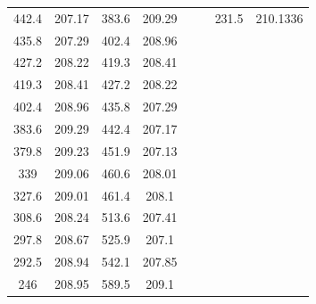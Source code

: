 \begin{center}
\begin{tabular}{|cccc|cc|cc|}
    442.4    & 207.17                  & 383.6  & 209.29                      &        &                             & 231.5    & 210.1336                           \\
    435.8    & 207.29                  & 402.4  & 208.96                      &        &                             &          &                                    \\
    427.2    & 208.22                  & 419.3  & 208.41                      &        &                             &          &                                    \\
    419.3    & 208.41                  & 427.2  & 208.22                      &        &                             &          &                                    \\
    402.4    & 208.96                  & 435.8  & 207.29                      &        &                             &          &                                    \\
    383.6    & 209.29                  & 442.4  & 207.17                      &        &                             &          &                                    \\
    379.8    & 209.23                  & 451.9  & 207.13                      &        &                             &          &                                    \\
    339      & 209.06                  & 460.6  & 208.01                      &        &                             &          &                                    \\
    327.6    & 209.01                  & 461.4  & 208.1                       &        &                             &          &                                    \\
    308.6    & 208.24                  & 513.6  & 207.41                      &        &                             &          &                                    \\
    297.8    & 208.67                  & 525.9  & 207.1                       &        &                             &          &                                    \\
    292.5    & 208.94                  & 542.1  & 207.85                      &        &                             &          &                                    \\
    246      & 208.95                  & 589.5  & 209.1                       &        &                             &          &                                    \\

\end{tabular}
\end{center}

